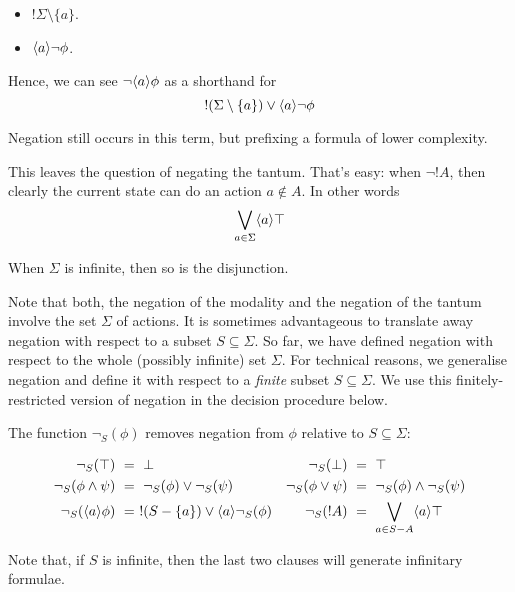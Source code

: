 \begin{itemize}

\item $!\Sigma \setminus \{a\}$.

\item $\langle a \rangle \neg \phi$.

\end{itemize}

\NI Hence, we can see $\neg \langle a \rangle \phi$ as a shorthand for 
\[
   !(\Sigma \setminus \{a\}) \lor \langle a \rangle \neg \phi
\]

\NI Negation still occurs in this term, but prefixing a formula of
lower complexity.

This leaves the question of negating the tantum. That's easy: when
$\neg !A$, then clearly the current state can do an action $a \notin
A$. In other words
\[
   \bigvee_{a \in \Sigma}\langle a \rangle \top
\]

\NI When $\Sigma$ is infinite, then so is the disjunction.

Note that both, the negation of the modality and the negation of
the tantum involve the set $\Sigma$ of actions. It is sometimes
advantageous to translate away negation with respect to a subset $S
\subseteq \Sigma$.  So far, we have defined negation with respect to
the whole (possibly infinite) set $\Sigma$. For technical reasons, we
generalise negation and define it with respect to a \emph{finite}
subset $S \subseteq \Sigma$. We use this finitely-restricted version of
negation in the decision procedure below.

\begin{definition}
The function $\neg_{S}(\phi)$ removes negation from $\phi$
relative to $S \subseteq \Sigma$:

\begin{align*}
  \neg_{S}(\top) &\ =\  \bot  &
  \neg_S(\bot) &\ =\  \top  \\
  \neg_S(\phi \land \psi) &\ =\  \neg_S(\phi) \lor \neg_S(\psi)  &
  \neg_S(\phi \lor \psi) &\ =\  \neg_S(\phi) \land \neg_S(\psi)  \\
  \neg_S(\langle a \rangle \phi) &\ =\  !(S-\{a\}) \lor \langle a \rangle \neg_S(\phi)  &
  \neg_S(! A) &\ =\  \bigvee_{a \in S - A} \langle a \rangle \top
\end{align*}


\end{definition}

\NI Note that, if $S$ is infinite, then the last two clauses will
generate infinitary formulae.

